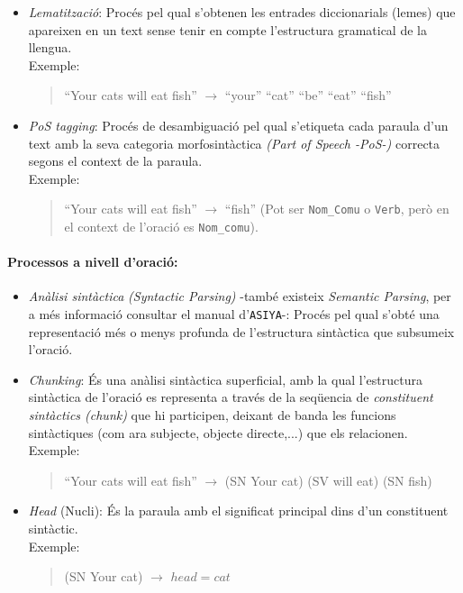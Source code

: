 \documentclass[11pt,a4paper]{article}
\begin{document}
\begin{itemize}
\item \textit{Lematització}: Procés pel qual s'obtenen les entrades diccionarials (lemes) que apareixen en un text sense tenir en compte l'estructura gramatical de la llengua. 
\\

Exemple:
\begin{quote}
``Your cats will eat fish'' $\longrightarrow$ ``your'' ``cat'' ``be'' ``eat'' ``fish''
\end{quote}

\item \textit{PoS tagging}: Procés de desambiguació pel qual s'etiqueta cada paraula d'un text amb la seva categoria morfosintàctica \textit{(Part of Speech -PoS-)} correcta segons el context de la paraula.
\\

Exemple:
\begin{quote}
``Your cats will eat fish'' $\longrightarrow$  ``fish'' (Pot ser \texttt{Nom\_Comu} o \texttt{Verb}, però en el context de l'oració es \texttt{Nom\_comu}).
\end{quote}
\end{itemize}


\paragraph{\textbf{Processos a nivell d'oració}:}
\begin{itemize}
\item \textit{Anàlisi sintàctica} \textit{(Syntactic Parsing)} -també existeix \textit{Semantic Parsing}, per a més informació consultar el manual d'\texttt{ASIYA}\cite{asiya_manual}-: Procés pel qual s'obté una representació més o menys profunda de l'estructura sintàctica que subsumeix l'oració.

\item \textit{Chunking}: És una anàlisi sintàctica superficial, amb la qual l'estructura sintàctica de l'oració es representa a través de la seqüencia de \textit{constituent sintàctics (chunk)} que hi participen, deixant de banda les funcions sintàctiques (com ara subjecte, objecte directe,...) que els relacionen.
\\

Exemple:
\begin{quote}
``Your cats will eat fish'' $\longrightarrow$ (SN Your cat) (SV will eat) (SN fish)
\end{quote}

\item \textit{Head} (Nucli): És la paraula amb el significat principal dins d'un constituent sintàctic.
\\

Exemple:
\begin{quote}
(SN Your cat) $\longrightarrow$ $head=cat$
\end{quote}

\end{itemize}
\end{document}
